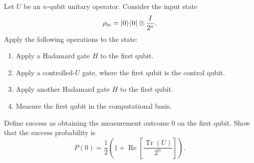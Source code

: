 ﻿\documentclass{homework}
\begin{document}
\begin{problem}
  Let \(U\) be an \(n\)-qubit unitary operator.
  Consider the input state 
  \begin{equation*}
    \rho_{\mathrm{in}} = \lvert\mspace{.5mu}0 \mspace{.5mu}\rangle\langle\mspace{.5mu}0 \mspace{.5mu}\rvert \otimes \frac{I}{2^n}.
  \end{equation*}
  Apply the following operations to the state:
  \begin{enumerate}
    \item Apply a Hadamard gate \(H\) to the first qubit.
    \item Apply a controlled-\(U\) gate, where the first qubit is the control
          qubit.
    \item Apply another Hadamard gate \(H\) to the first qubit.
    \item Measure the first qubit in the computational basis.
  \end{enumerate}
  Define success as obtaining the measurement outcome \(0\) on the first qubit.
  Show that the success probability is
  \begin{equation*}
    P(0) = \frac{1}{2}
    \left(
      1+ \operatorname{Re} \left[
        \frac{\operatorname{Tr}(U)}{2^n} \right]
    \right).
  \end{equation*}
\end{problem}

\begin{solution}

\end{solution}
\end{document}
